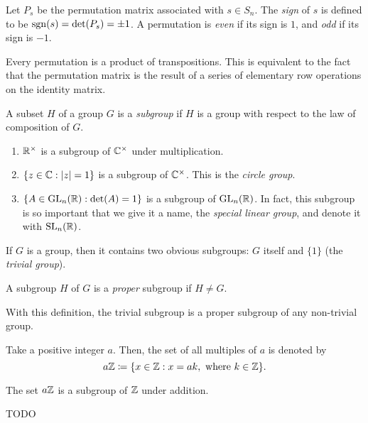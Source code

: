 \begin{definition}
  Let $P_s$ be the permutation matrix associated with $s \in S_n$. The \emph{sign} of $s$ is defined to be $\operatorname{sgn}(s) = \det(P_s) = \pm 1$. A permutation is \emph{even} if its sign is $1$, and \emph{odd} if its sign is $-1$.
\end{definition}

\begin{remark}
  Every permutation is a product of transpositions. This is equivalent to the fact that the permutation matrix is the result of a series of elementary row operations on the identity matrix.
\end{remark}

\begin{definition}[Subgroup]
  A subset $H$ of a group $G$ is a \emph{subgroup} if $H$ is a group with respect to the law of composition of $G$.
\end{definition}

\begin{example} \phantom{}
  \begin{enumerate}
    \item $\mathbb{R}^{\times}$ is a subgroup of $\mathbb{C}^{\times}$ under multiplication.
    \item $\{z \in \mathbb{C} : \lvert z\rvert = 1\}$ is a subgroup of $\mathbb{C}^{\times}$. This is the \emph{circle group}.
    \item $\{A \in \operatorname{GL}_n(\mathbb{R}) : \det(A) = 1\}$ is a subgroup of $\operatorname{GL}_n(\mathbb{R})$. In fact, this subgroup is so important that we give it a name, the \emph{special linear group}, and denote it with $\operatorname{SL}_n(\mathbb{R})$.
  \end{enumerate}
\end{example}

\begin{remark}
  If $G$ is a group, then it contains two obvious subgroups: $G$ itself and $\{1\}$ (the \emph{trivial group}).
\end{remark}

\begin{definition}
  A subgroup $H$ of $G$ is a \emph{proper} subgroup if $H \neq G$.
\end{definition}

With this definition, the trivial subgroup is a proper subgroup of any non-trivial group.

Take a positive integer $a$. Then, the set of all multiples of $a$ is denoted by \[
  a\mathbb{Z} \coloneq \{x \in \mathbb{Z} : x = ak,\ \text{where}\ k \in \mathbb{Z}\}.
\] 
\begin{proposition}
  The set $a\mathbb{Z}$ is a subgroup of $\mathbb{Z}$ under addition.
\end{proposition}
\begin{proposition}
  TODO
\end{proposition}

